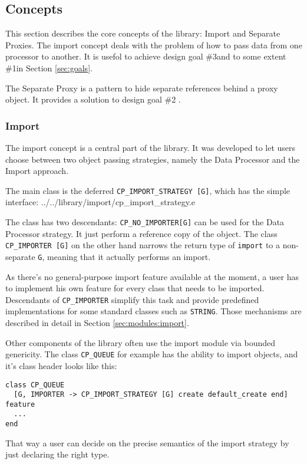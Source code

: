 \documentclass[a4paper,10pt]{report}
\newcommand{\todoref}{\todo{ref}}
\begin{document}
\subsection{Concepts}

This section describes the core concepts of the library: Import and Separate Proxies.
The import concept deals with the problem of how to pass data from one processor to another.
It is usefol to achieve design goal \#3\todoref and to some extent \#1\todoref in Section \ref{sec:goals}.

The Separate Proxy is a pattern to hide separate references behind a proxy object.
It provides a solution to design goal \#2 \todoref.

\subsubsection{Import}

The import concept is a central part of the library.
It was developed to let users choose between two object passing strategies, namely the Data Processor \todoref and the Import \todoref approach.

The main class is the deferred \lstinline!CP_IMPORT_STRATEGY [G]!, which has the simple interface:
 {../../library/import/cp_import_strategy.e}

The class has two descendants: \lstinline!CP_NO_IMPORTER[G]! can be used for the Data Processor strategy. 
It just perform a reference copy of the object.
The class \lstinline!CP_IMPORTER [G]! on the other hand narrows the return type of \lstinline!import! to a non-separate \lstinline!G!, meaning that it actually performs an import.

As there's no general-purpose import feature available at the moment, a user has to implement his own feature for every class that needs to be imported.
Descendants of \lstinline!CP_IMPORTER! simplify this task and provide predefined implementations for some standard classes such as \lstinline!STRING!.
Those mechanisms are described in detail in Section \ref{sec:modules:import}.

Other components of the library often use the import module via bounded genericity.
The class \lstinline!CP_QUEUE! for example has the ability to import objects, and it's class header looks like this:
\begin{lstlisting}
class CP_QUEUE
  [G, IMPORTER -> CP_IMPORT_STRATEGY [G] create default_create end]
feature
  ...
end
\end{lstlisting}
That way a user can decide on the precise semantics of the import strategy by just declaring the right type.
\end{document}
